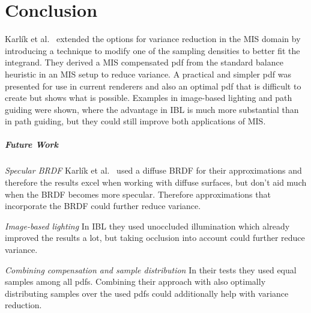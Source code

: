 \chapter{Conclusion}
\label{ch:conclusion}
Karl\'ik et al.~\cite{Karlik2019} extended the options for variance reduction in the MIS domain
by introducing a technique to modify one of the sampling densities to better fit the integrand.
They derived a MIS compensated pdf from the standard balance heuristic in an MIS setup to reduce variance.
A practical and simpler pdf was presented for use in current renderers
and also an optimal pdf that is difficult to create but shows what is possible.
Examples in image-based lighting and path guiding were shown,
where the advantage in IBL is much more substantial than in path guiding,
but they could still improve both applications of MIS.


\paragraph{Future Work}
\label{par:future_work}
\textit{Specular BRDF} Karl\'ik et al.~\cite{Karlik2019} used a diffuse BRDF for their approximations
and therefore the results excel when working with diffuse surfaces,
but don't aid much when the BRDF becomes more specular.
Therefore approximations that incorporate the BRDF could further reduce variance.

\textit{Image-based lighting} In IBL they used unoccluded illumination which already improved the results a lot,
but taking occlusion into account could further reduce variance.

\textit{Combining compensation and sample distribution} In their tests they used equal samples among all pdfs.
Combining their approach with also optimally distributing samples over the used pdfs could additionally help with variance reduction.